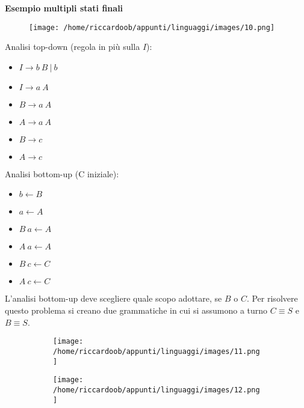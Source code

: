 \textbf{Esempio multipli stati finali}\\
\begin{figure}[H]
    \centering
    \texttt{[image: /home/riccardoob/appunti/linguaggi/images/10.png]}
\end{figure}

\begin{multicols}{2}
\noindent
Analisi top-down (regola in più sulla $I$):
\begin{itemize}
    \item $I \rightarrow b\ B\ |\ b$
    \item $I \rightarrow a\ A$
    \item $B \rightarrow a\ A$
    \item $A \rightarrow a\ A$
    \item $B \rightarrow c$
    \item $A \rightarrow c$
\end{itemize}

\columnbreak
\noindent
Analisi bottom-up (C iniziale):
\begin{itemize}
    \item $b \leftarrow  B$
    \item $a \leftarrow  A$
    \item $B\ a \leftarrow  A$
    \item $A\ a \leftarrow  A$
    \item $B\ c \leftarrow  C$
    \item $A\ c \leftarrow  C$
\end{itemize}
\end{multicols}
\setlist{}
L'analisi bottom-up deve scegliere quale scopo adottare, se $B$ o $C$. Per risolvere questo problema si creano due grammatiche in cui si assumono a turno $C \equiv S$ e $B \equiv S$.


\begin{figure}[H]
    \begin{subfigure}{0.5\textwidth}
        \centering
        \texttt{[image: /home/riccardoob/appunti/linguaggi/images/11.png]}
    \end{subfigure}%
    \begin{subfigure}{0.5\textwidth}
        \centering
        \texttt{[image: /home/riccardoob/appunti/linguaggi/images/12.png]}
    \end{subfigure}

\end{figure}

